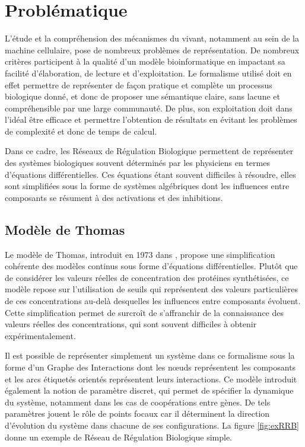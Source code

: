 
\chapter{Problématique}

L'étude et la compréhension des mécanismes du vivant, notamment au sein de la machine cellulaire, pose de nombreux problèmes de représentation.
De nombreux critères participent à la qualité d'un modèle bioinformatique en impactant sa facilité d'élaboration, de lecture et d'exploitation.
Le formalisme utilisé doit en effet permettre de représenter de façon pratique et complète un processus biologique donné, et donc
de proposer une sémantique claire, sans lacune et compréhensible par une large communauté.
De plus, son exploitation doit dans l'idéal être efficace et permettre l'obtention de résultats en évitant les problèmes de complexité et donc de temps de calcul.

Dans ce cadre, les Réseaux de Régulation Biologique permettent de représenter des systèmes biologiques souvent déterminés par les physiciens en termes d'équations différentielles.
Ces équations étant souvent difficiles à résoudre, elles sont simplifiées sous la forme de systèmes algébriques dont les influences entre composants se résument à des activations et des inhibitions.

\section{Modèle de Thomas}
Le modèle de Thomas, introduit en 1973 dans \cite{Thomas73}, propose une simplification cohérente des modèles continus sous forme d'équations différentielles.
Plutôt que de considérer les valeurs réelles de concentration des protéines synthétisées, ce modèle repose sur l'utilisation de seuils qui représentent des valeurs particulières de ces concentrations au-delà desquelles les influences entre composants évoluent.
Cette simplification permet de surcroît de s'affranchir de la connaissance des valeurs réelles des concentrations, qui sont souvent difficiles à obtenir expérimentalement.

Il est possible de représenter simplement un système dans ce formalisme sous la forme d'un Graphe des Interactions dont les nœuds représentent les composants et les arcs étiquetés orientés représentent leurs interactions.
Ce modèle introduit également la notion de paramètre discret, qui permet de spécifier la dynamique du système, notamment dans les cas de coopérations entre gènes.
De tels paramètres jouent le rôle de points focaux car il déterminent la direction d'évolution du système dans chacune de ses configurations.
La figure \ref{fig:exRRB} donne un exemple de Réseau de Régulation Biologique simple.

